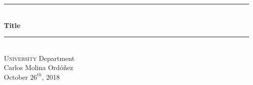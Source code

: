 
\begin{titlepage}

\newcommand{\HRule}{\rule{\linewidth}{0.5mm}} %

\center %


\HRule \\[0.2cm]
{ \Large \bfseries
Title\\
}
\HRule \\[1.5cm]


\textsc{\large University}
\large Department\\[0.8cm]

{ \normalsize Carlos Molina Ordóñez}\\

{\normalsize October $26^{th}$, 2018}\\[2cm] %



\vfill %

\end{titlepage}
